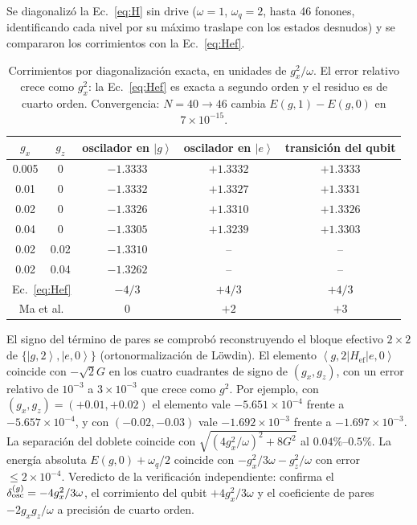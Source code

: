 \documentclass[11pt,a4paper]{article}
\newcommand{\ket}[1]{\left|#1\right\rangle}
\newcommand{\bra}[1]{\left\langle#1\right|}
\newcommand{\Href}{H_{\mathrm{ef}}}
\theoremstyle{definition}
\begin{document}
Se diagonalizó la Ec.~\eqref{eq:H} sin drive ($\omega=1$, $\omega_q=2$, hasta 46 fonones, identificando cada nivel por su máximo traslape con los estados desnudos) y se compararon los corrimientos con la Ec.~\eqref{eq:Hef}.

\begin{table}[h]
\centering
\begin{tabular}{ccccc}
\toprule
$g_x$ & $g_z$ & oscilador en $\ket{g}$ & oscilador en $\ket{e}$ & transición del qubit\\
\midrule
0.005 & 0 & $-1.3333$ & $+1.3332$ & $+1.3333$\\
0.01 & 0 & $-1.3332$ & $+1.3327$ & $+1.3331$\\
0.02 & 0 & $-1.3326$ & $+1.3310$ & $+1.3326$\\
0.04 & 0 & $-1.3305$ & $+1.3239$ & $+1.3303$\\
0.02 & 0.02 & $-1.3310$ & -- & --\\
0.02 & 0.04 & $-1.3262$ & -- & --\\
\midrule
\multicolumn{2}{c}{Ec.~\eqref{eq:Hef}} & $-4/3$ & $+4/3$ & $+4/3$\\
\multicolumn{2}{c}{Ma et al.} & $0$ & $+2$ & $+3$\\
\bottomrule
\end{tabular}
\caption{Corrimientos por diagonalización exacta, en unidades de $g_x^2/\omega$. El error relativo crece como $g_x^2$: la Ec.~\eqref{eq:Hef} es exacta a segundo orden y el residuo es de cuarto orden. Convergencia: $N=40\to46$ cambia $E(g,1)-E(g,0)$ en $7\times10^{-15}$.}
\label{tab:ED}
\end{table}

El signo del término de pares se comprobó reconstruyendo el bloque efectivo $2\times2$ de $\{\ket{g,2},\ket{e,0}\}$ (ortonormalización de Löwdin). El elemento $\bra{g,2}\Href\ket{e,0}$ coincide con $-\sqrt2G$ en los cuatro cuadrantes de signo de $(g_x,g_z)$, con un error relativo de $10^{-3}$ a $3\times10^{-3}$ que crece como $g^2$. Por ejemplo, con $(g_x,g_z)=(+0.01,+0.02)$ el elemento vale $-5.651\times10^{-4}$ frente a $-5.657\times10^{-4}$, y con $(-0.02,-0.03)$ vale $-1.692\times10^{-3}$ frente a $-1.697\times10^{-3}$. La separación del doblete coincide con $\sqrt{(4g_x^2/\omega)^2+8G^2}$ al $0.04\%$--$0.5\%$. La energía absoluta $E(g,0)+\omega_q/2$ coincide con $-g_x^2/3\omega-g_z^2/\omega$ con error $\leq2\times10^{-4}$. Veredicto de la verificación independiente: confirma el $\delta_{\rm osc}^{(g)}=-4g_x^2/3\omega$, el corrimiento del qubit $+4g_x^2/3\omega$ y el coeficiente de pares $-2g_xg_z/\omega$ a precisión de cuarto orden.
\end{document}
